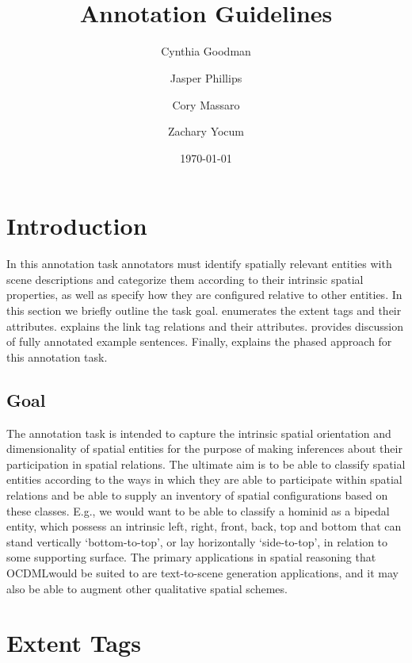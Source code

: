 \documentclass[11pt]{article}
\title{\nameML\\
{\Large Annotation Guidelines \version}}
\author{
    Cynthia Goodman\\
    \and
    Jasper Phillips\\
    \and
    Cory Massaro\\
    \and
    Zachary Yocum\\
}
\date{\today}
\newcommand{\ML}{OCDML}
\begin{document}
    
\maketitle

\tableofcontents
\newpage

\section{Introduction} %
\label{sec:introduction}
In this annotation task annotators must identify spatially relevant entities with scene descriptions and categorize them according to their intrinsic spatial properties, as well as specify how they are configured relative to other entities. In this section we briefly outline the task goal.  enumerates the extent tags and their attributes.  explains the link tag relations and their attributes.  provides discussion of fully annotated example sentences. Finally,  explains the phased approach for this annotation task.

\subsection{Goal} %
\label{sub:goal}
The annotation task is intended to capture the intrinsic spatial orientation and dimensionality of spatial entities for the purpose of making inferences about their participation in spatial relations. The ultimate aim is to be able to classify spatial entities according to the ways in which they are able to participate within spatial relations and be able to supply an inventory of spatial configurations based on these classes. E.g., we would want to be able to classify a hominid as a bipedal entity, which possess an intrinsic left, right, front, back, top and bottom that can stand vertically `bottom-to-top', or lay horizontally `side-to-top', in relation to some supporting surface. The primary applications in spatial reasoning that \ML would be suited to are text-to-scene generation applications, and it may also be able to augment other qualitative spatial schemes.


\section{Extent Tags} %
\label{sec:extent_tags}
\end{document}

